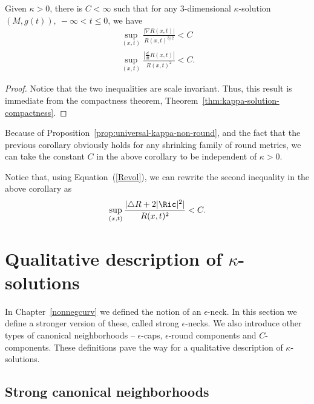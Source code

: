 \begin{corollary}\label{cor:curvature-derivative-bounds-universal}
\label{derivcor}
Given $\kappa>0$, there is $C<\infty$ such that for any
$3$-dimensional $\kappa$-solution $(M,g(t)),\ -\infty<t\le 0$, we
have
\begin{eqnarray}\label{gradest} \sup_{(x,t)}\frac{|\nabla R(x,t)|}{R(x,t)^{3/2}}< C\\
\label{timeest} \sup_{(x,t)}\frac{\left|\frac{d}{dt}R(x,t)\right|}{R(x,t)^2}<C.
\end{eqnarray}

\end{corollary}



\begin{proof}
Notice that the two inequalities are scale invariant. Thus, this
result is immediate from the compactness theorem,
Theorem~\ref{thm:kappa-solution-compactness}.
\end{proof}

Because of Proposition~\ref{prop:universal-kappa-non-round}, and the fact that the previous
corollary obviously holds for any shrinking family of round metrics,
we can take the constant $C$ in the above corollary to be
independent of $\kappa>0$.

Notice that, using Equation~(\ref{Revol}), we can rewrite the second
inequality in the above corollary as
\begin{eqnarray*}
\sup_{(x,t)}\frac{|\triangle R+2|\Ric|^2|}{R(x,t)^2}<C.
\end{eqnarray*}



\section{Qualitative description of
$\kappa$-solutions}

In Chapter~\ref{nonnegcurv} we defined the notion of an
$\epsilon$-neck. In this section we define a stronger version of
these, called strong $\epsilon$-necks. We also introduce other types
of canonical neighborhoods -- $\epsilon$-caps, $\epsilon$-round
components and $C$-components. These definitions pave the way for a
qualitative description of $\kappa$-solutions.



\subsection{Strong canonical neighborhoods}

